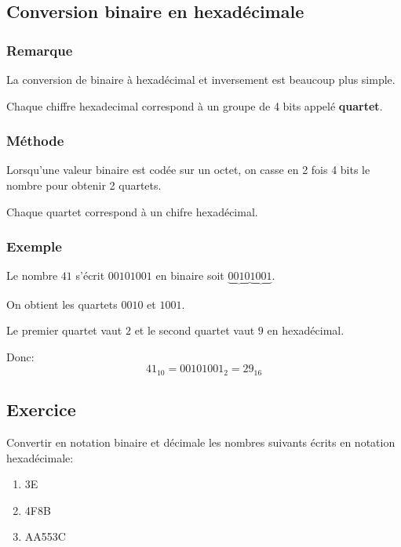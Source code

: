 \documentclass[11pt]{article}
\providecommand{\tightlist}{%
      \setlength{\itemsep}{0pt}\setlength{\parskip}{0pt}}
\begin{document}
\hypertarget{conversion-binaire-en-hexaduxe9cimale}{%
\subsection{Conversion binaire en
hexadécimale}\label{conversion-binaire-en-hexaduxe9cimale}}

\hypertarget{remarque}{%
\subsubsection*{Remarque}\label{remarque}}

La conversion de binaire à hexadécimal et inversement est beaucoup plus
simple.

Chaque chiffre hexadecimal correspond à un groupe de 4 bits appelé
\textbf{quartet}.

\hypertarget{muxe9thode-1}{%
\subsubsection*{Méthode}\label{muxe9thode-1}}

Lorsqu'une valeur binaire est codée sur un octet, on casse en 2 fois 4
bits le nombre pour obtenir 2 quartets.

Chaque quartet correspond à un chifre hexadécimal.

\hypertarget{exemple-1}{%
\subsubsection*{Exemple}\label{exemple-1}}

Le nombre \(41\) s'écrit \(00101001\) en binaire soit
\(\underbrace{0010}\underbrace{1001}\).

On obtient les quartets \(0010\) et \(1001\).

Le premier quartet vaut \(2\) et le second quartet vaut \(9\) en
hexadécimal.

Donc: \[41_{10}=00101001_{2}=29_{16}\]

    \hypertarget{exercice}{%
\subsection{Exercice}\label{exercice}}

Convertir en notation binaire et décimale les nombres suivants écrits en
notation hexadécimale:

\begin{enumerate}
\def\labelenumi{\arabic{enumi}.}
\tightlist
\item
  3E
\item
  4F8B
\item
  AA553C
\end{enumerate}
\end{document}
